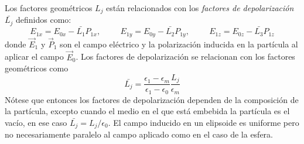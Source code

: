 Los factores geométricos $L_j$ están relacionados con los \textit{factores de depolarización} $\bar{L_j}$ definidos como:
\begin{equation*}
    E_{1x}=E_{0x}-\bar{L_1}P_{1x},\hspace{1cm}    E_{1y}=E_{0y}-\bar{L_2}P_{1y},\hspace{1cm}    E_{1z}=E_{0z}-\bar{L_3}P_{1z}
\end{equation*}
donde $\Vec{E}_1$ y $\Vec{P}_1$ son el campo eléctrico y la polarización inducida en la partícula al aplicar el campo $\Vec{E}_0$. Los factores de depolarización se relacionan con los factores geométricos como \cite{Bohren}
\begin{equation*}
    \bar{L_j}=\frac{\epsilon_1-\epsilon_m}{\epsilon_1-\epsilon_0}\frac{L_j}{\epsilon_m}
\end{equation*}
Nótese que entonces los factores de depolarización dependen de la composición de la partícula, excepto cuando el medio en el que está embebida la partícula es el vacío, en ese caso $\bar{L_j}=L_j/\epsilon_0$. El campo inducido en un elipsoide es uniforme pero no necesariamente paralelo al campo aplicado como en el caso de la esfera.
